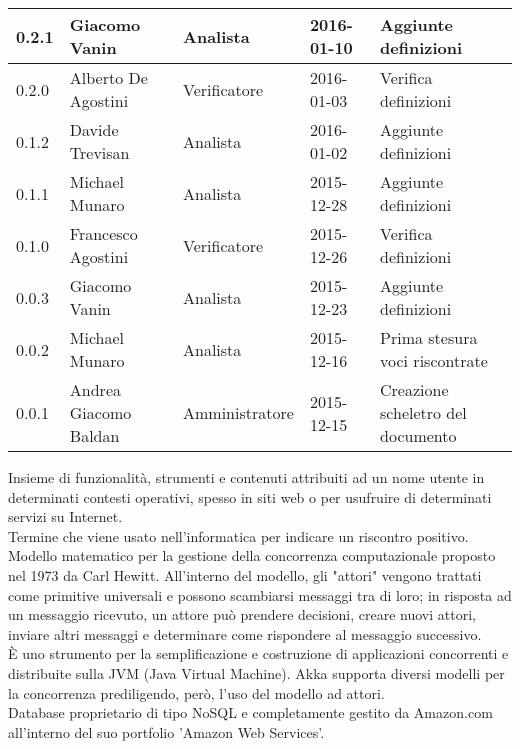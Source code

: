 \documentclass{scalatekids-article}
\begin{document}
\begin{center}
\begin{longtable}{|l | l | l | l | l |}
    \hline
    0.2.1 & Giacomo Vanin & Analista & 2016-01-10 & Aggiunte definizioni\\
    \hline
    0.2.0 & Alberto De Agostini & Verificatore & 2016-01-03 & Verifica definizioni\\
    \hline
    0.1.2 & Davide Trevisan & Analista & 2016-01-02 & Aggiunte definizioni\\
    \hline
    0.1.1 & Michael Munaro & Analista & 2015-12-28 & Aggiunte definizioni\\
    \hline
    0.1.0 & Francesco Agostini & Verificatore & 2015-12-26 & Verifica definizioni\\
    \hline
    0.0.3 & Giacomo Vanin & Analista & 2015-12-23 & Aggiunte definizioni\\
    \hline
    0.0.2 & Michael Munaro & Analista & 2015-12-16 & Prima stesura voci riscontrate\\
    \hline
    0.0.1 & Andrea Giacomo Baldan & Amministratore & 2015-12-15 & Creazione scheletro del documento\\
    \hline
  \end{longtable}
\end{center}

\newpage
{}
 Insieme di funzionalità, strumenti e contenuti attribuiti ad un nome utente in determinati contesti operativi, spesso in siti web o per usufruire di determinati servizi su Internet.
\\

 Termine che viene usato nell'informatica per indicare un riscontro positivo.
\\

 Modello matematico per la gestione della concorrenza computazionale proposto nel 1973 da Carl Hewitt.
All'interno del modello, gli "attori" vengono trattati come primitive universali e possono scambiarsi messaggi tra di loro; in risposta ad un messaggio ricevuto, un attore può prendere decisioni, creare nuovi attori, inviare altri messaggi e determinare come rispondere al messaggio successivo.
\\

 È uno strumento per la semplificazione e costruzione di applicazioni concorrenti e distribuite sulla JVM (Java Virtual Machine). Akka supporta diversi modelli per la concorrenza prediligendo, però, l'uso del modello ad attori.
\\

 Database proprietario di tipo NoSQL e completamente gestito da Amazon.com all'interno del suo portfolio 'Amazon Web Services'.
\\
\end{document}

